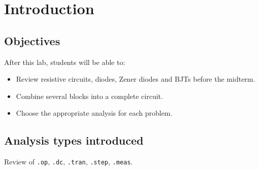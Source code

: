 \section{Introduction}


\subsection{Objectives}
After this lab, students will be able to:
\begin{itemize}[itemsep=2pt]
  \item Review resistive circuits, diodes, Zener diodes and BJTs before the midterm.
  \item Combine several blocks into a complete circuit.
  \item Choose the appropriate analysis for each problem.
\end{itemize}

\subsection{Analysis types introduced}
Review of \texttt{.op}, \texttt{.dc}, \texttt{.tran}, \texttt{.step}, \texttt{.meas}.
